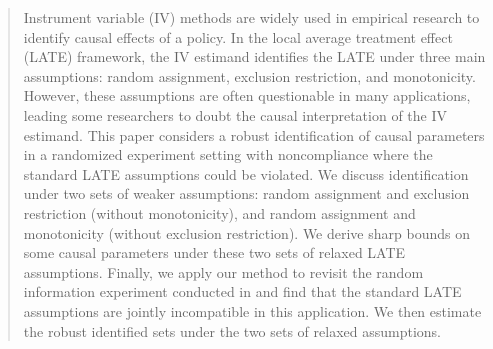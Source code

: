 \documentclass[12pt]{article}
\theoremstyle{plain}
\theoremstyle{definition}
\theoremstyle{remark}
\begin{document}
\begin{abstract}
Instrument variable (IV) methods are widely used in empirical research to identify causal effects of a policy. In the local average treatment effect (LATE) framework, the IV estimand identifies the LATE under three main assumptions: random assignment, exclusion restriction, and monotonicity. However, these assumptions are often questionable in many applications, leading some researchers to doubt the causal interpretation of the IV estimand. This paper considers a robust identification of causal parameters in a randomized experiment setting with noncompliance where the standard LATE assumptions could be violated. %
We discuss identification under two sets of weaker assumptions: random assignment and exclusion restriction (without monotonicity), and random assignment and monotonicity (without exclusion restriction). %
We derive sharp bounds on some causal parameters under these two sets of relaxed LATE assumptions. Finally, we apply our method to revisit the random information experiment conducted in \cite{bursztyn2020misperceived} and find that the standard LATE assumptions are jointly incompatible in this application. We then estimate the robust identified sets under the two sets of relaxed assumptions.




\end{abstract}
\end{document}
